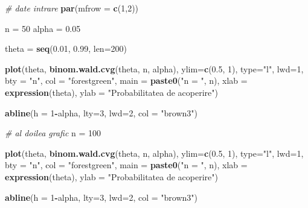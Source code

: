 \documentclass[]{article}
\newenvironment{Shaded}{\begin{snugshade}}{\end{snugshade}}
\newcommand{\KeywordTok}[1]{\textcolor[rgb]{0.13,0.29,0.53}{\textbf{#1}}}
\newcommand{\DataTypeTok}[1]{\textcolor[rgb]{0.13,0.29,0.53}{#1}}
\newcommand{\DecValTok}[1]{\textcolor[rgb]{0.00,0.00,0.81}{#1}}
\newcommand{\FloatTok}[1]{\textcolor[rgb]{0.00,0.00,0.81}{#1}}
\newcommand{\StringTok}[1]{\textcolor[rgb]{0.31,0.60,0.02}{#1}}
\newcommand{\CommentTok}[1]{\textcolor[rgb]{0.56,0.35,0.01}{\textit{#1}}}
\newcommand{\OperatorTok}[1]{\textcolor[rgb]{0.81,0.36,0.00}{\textbf{#1}}}
\newcommand{\NormalTok}[1]{#1}
\begin{document}
\begin{Shaded}
\begin{Highlighting}[]
\CommentTok{# date intrare}
\KeywordTok{par}\NormalTok{(}\DataTypeTok{mfrow =} \KeywordTok{c}\NormalTok{(}\DecValTok{1}\NormalTok{,}\DecValTok{2}\NormalTok{))}

\NormalTok{n =}\StringTok{ }\DecValTok{50}
\NormalTok{alpha =}\StringTok{ }\FloatTok{0.05}

\NormalTok{theta =}\StringTok{ }\KeywordTok{seq}\NormalTok{(}\FloatTok{0.01}\NormalTok{, }\FloatTok{0.99}\NormalTok{, }\DataTypeTok{len=}\DecValTok{200}\NormalTok{)}

\KeywordTok{plot}\NormalTok{(theta, }\KeywordTok{binom.wald.cvg}\NormalTok{(theta, n, alpha), }
     \DataTypeTok{ylim=}\KeywordTok{c}\NormalTok{(}\FloatTok{0.5}\NormalTok{, }\DecValTok{1}\NormalTok{), }\DataTypeTok{type=}\StringTok{"l"}\NormalTok{, }\DataTypeTok{lwd=}\DecValTok{1}\NormalTok{,}
     \DataTypeTok{bty =} \StringTok{"n"}\NormalTok{,}
     \DataTypeTok{col =} \StringTok{"forestgreen"}\NormalTok{, }
     \DataTypeTok{main =} \KeywordTok{paste0}\NormalTok{(}\StringTok{"n = "}\NormalTok{, n),}
     \DataTypeTok{xlab =} \KeywordTok{expression}\NormalTok{(theta), }
     \DataTypeTok{ylab =} \StringTok{"Probabilitatea de acoperire"}\NormalTok{)}

\KeywordTok{abline}\NormalTok{(}\DataTypeTok{h =} \DecValTok{1}\OperatorTok{-}\NormalTok{alpha, }\DataTypeTok{lty=}\DecValTok{3}\NormalTok{, }\DataTypeTok{lwd=}\DecValTok{2}\NormalTok{,}
       \DataTypeTok{col =} \StringTok{"brown3"}\NormalTok{)}

\CommentTok{# al doilea grafic}
\NormalTok{n =}\StringTok{ }\DecValTok{100}

\KeywordTok{plot}\NormalTok{(theta, }\KeywordTok{binom.wald.cvg}\NormalTok{(theta, n, alpha), }
     \DataTypeTok{ylim=}\KeywordTok{c}\NormalTok{(}\FloatTok{0.5}\NormalTok{, }\DecValTok{1}\NormalTok{), }\DataTypeTok{type=}\StringTok{"l"}\NormalTok{, }\DataTypeTok{lwd=}\DecValTok{1}\NormalTok{,}
     \DataTypeTok{bty =} \StringTok{"n"}\NormalTok{,}
     \DataTypeTok{col =} \StringTok{"forestgreen"}\NormalTok{, }
     \DataTypeTok{main =} \KeywordTok{paste0}\NormalTok{(}\StringTok{"n = "}\NormalTok{, n),}
     \DataTypeTok{xlab =} \KeywordTok{expression}\NormalTok{(theta), }
     \DataTypeTok{ylab =} \StringTok{"Probabilitatea de acoperire"}\NormalTok{)}

\KeywordTok{abline}\NormalTok{(}\DataTypeTok{h =} \DecValTok{1}\OperatorTok{-}\NormalTok{alpha, }\DataTypeTok{lty=}\DecValTok{3}\NormalTok{, }\DataTypeTok{lwd=}\DecValTok{2}\NormalTok{,}
       \DataTypeTok{col =} \StringTok{"brown3"}\NormalTok{)}
\end{Highlighting}
\end{Shaded}
\end{document}
